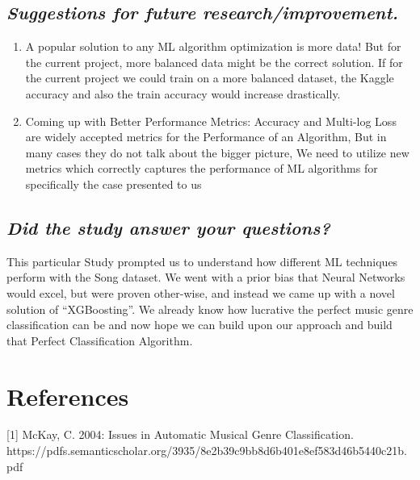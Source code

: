 \documentclass[11pt]{article}
\providecommand{\tightlist}{%
      \setlength{\itemsep}{0pt}\setlength{\parskip}{0pt}}
\begin{document}
\hypertarget{suggestions-for-future-researchimprovement.}{%
\subsection{\texorpdfstring{\emph{Suggestions for future
research/improvement.}}{Suggestions for future research/improvement.}}\label{suggestions-for-future-researchimprovement.}}

\begin{enumerate}
\def\labelenumi{\arabic{enumi}.}
\tightlist
\item
  A popular solution to any ML algorithm optimization is more data! But
  for the current project, more balanced data might be the correct
  solution. If for the current project we could train on a more balanced
  dataset, the Kaggle accuracy and also the train accuracy would
  increase drastically.
\item
  Coming up with Better Performance Metrics: Accuracy and Multi-log Loss
  are widely accepted metrics for the Performance of an Algorithm, But
  in many cases they do not talk about the bigger picture, We need to
  utilize new metrics which correctly captures the performance of ML
  algorithms for specifically the case presented to us
\end{enumerate}

\hypertarget{did-the-study-answer-your-questions}{%
\subsection{\texorpdfstring{\emph{Did the study answer your
questions?}}{Did the study answer your questions?}}\label{did-the-study-answer-your-questions}}

This particular Study prompted us to understand how different ML
techniques perform with the Song dataset. We went with a prior bias that
Neural Networks would excel, but were proven other-wise, and instead we
came up with a novel solution of ``XGBoosting''. We already know how
lucrative the perfect music genre classification can be and now hope we
can build upon our approach and build that Perfect Classification
Algorithm.

    \hypertarget{references}{%
\section{References}\label{references}}

{[}1{]} McKay, C. 2004: Issues in Automatic Musical Genre
Classification.
https://pdfs.semanticscholar.org/3935/8e2b39c9bb8d6b401e8ef583d46b5440c21b.pdf
\end{document}
